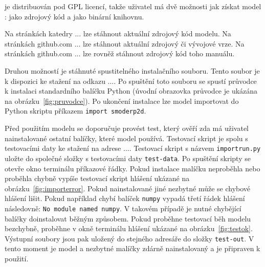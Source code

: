  
  \smod je distribuován pod GPL licencí, takže uživatel má dvě možnosti jak získat model \smod: jako zdrojový kód a jako binární knihovnu. 
  
  Na stránkách katedry ...  lze stáhnout aktuální zdrojový kód modelu. Na stránkách github.com ...  lze stáhnout aktuální zdrojový či vývojové vrze. Na stránkách github.com ...   lze rovněž stáhnout zdrojový kód toho manuálu. 
  
  Druhou možností je stáhnuté spustitelného instalačního souboru. Tento soubor je k dispozici ke stažení na odkazu .... Po spuštění toto souboru se spustí průvodce k instalaci standardního balíčku Python (úvodní obrazovka průvodce je ukázána na obrázku~\ref{fig:pruvodce}). Po ukončení instalace lze model \smod importovat do Python skriptu příkazem {\tt import smoderp2d}. 

  Před použitím modelu se doporučuje provést test, který ověří zda má uživatel nainstalované ostatní balíčky, které model \smod používá. Testovací skript je spolu s testovacími daty ke stažení na adrese .... Testovací skript s názvem {\tt importrun.py} uložte do společné složky s testovacími daty {\tt test-data}. Po spuštění skripty se otevře okno terminálu příkazové řádky. Pokud instalace malíčku \smod neproběhla nebo proběhla chybně vypíše testovací skript hlášení ukázané na obrázku~\ref{fig:importerror}. Pokud nainstalované jiné nezbytné může se chybové hlášení lišit. Pokud například chybí balíček {\tt numpy} vypadá třetí řádek hlášení následovně: {\tt No module named numpy}. V takovém případě je nutné chybějící balíčky doinstalovat běžným způsobem. Pokud proběhne testovací běh modelu \smod bezchybně, proběhne v okně terminálu hlášení ukázané na obrázku~\ref{fig:testok}. Výstupní soubory jsou pak uložený do stejného adresáře do složky {\tt test-out}. V tento moment je model \smod a nezbytné malíčky zdárně nainstalovaný a je připraven k použití.
  
